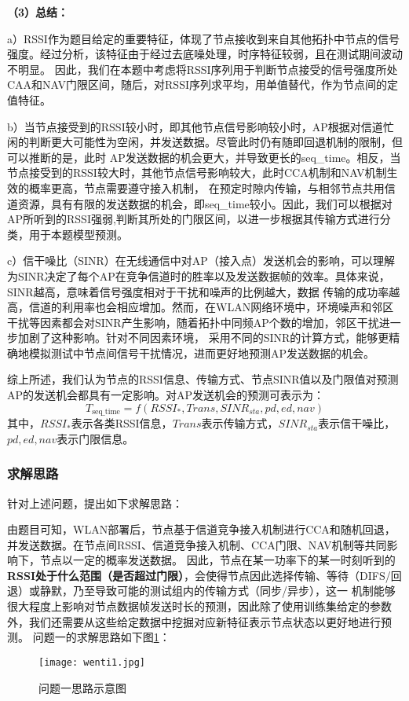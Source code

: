 \documentclass[bwprint]{gmcmthesis}
\begin{document}

\textbf{（3）总结：}

a）RSSI作为题目给定的重要特征，体现了节点接收到来自其他拓扑中节点的信号强度。经过分析，该特征由于经过去底噪处理，时序特征较弱，且在测试期间波动不明显。
因此，我们在本题中考虑将RSSI序列用于判断节点接受的信号强度所处CAA和NAV门限区间，随后，对RSSI序列求平均，用单值替代，作为节点间的定值特征。

b）当节点接受到的RSSI较小时，即其他节点信号影响较小时，AP根据对信道忙闲的判断更大可能性为空闲，并发送数据。尽管此时仍有随即回退机制的限制，但可以推断的是，此时
AP发送数据的机会更大，并导致更长的seq\_time。相反，当节点接受到的RSSI较大时，其他节点信号影响较大，此时CCA机制和NAV机制生效的概率更高，节点需要遵守接入机制，
在预定时隙内传输，与相邻节点共用信道资源，具有有限的发送数据的机会，即seq\_time较小。因此，我们可以根据对AP所听到的RSSI强弱,判断其所处的门限区间，以进一步根据其传输方式进行分类，用于本题模型预测。

c）信干噪比（SINR）在无线通信中对AP（接入点）发送机会的影响，可以理解为SINR决定了每个AP在竞争信道时的胜率以及发送数据帧的效率。具体来说，SINR越高，意味着信号强度相对于干扰和噪声的比例越大，数据
传输的成功率越高，信道的利用率也会相应增加。然而，在WLAN网络环境中，环境噪声和邻区干扰等因素都会对SINR产生影响，随着拓扑中同频AP个数的增加，邻区干扰进一步加剧了这种影响。针对不同因素环境，
采用不同的SINR的计算方式，能够更精确地模拟测试中节点间信号干扰情况，进而更好地预测AP发送数据的机会。

综上所述，我们认为节点的RSSI信息、传输方式、节点SINR值以及门限值对预测AP的发送机会都具有一定影响。对AP发送机会的预测可表示为：
$$T_{\text{seq\_time}}=f(RSSI_{*},Trans,SINR_{sta},pd,ed,nav)$$
其中，$RSSI_{*}$表示各类RSSI信息，$Trans$表示传输方式，$SINR_{sta}$表示信干噪比，$pd,ed,nav$表示门限信息。



\subsubsection{求解思路}
针对上述问题，提出如下求解思路：

由题目可知，WLAN部署后，节点基于信道竞争接入机制进行CCA和随机回退，并发送数据。在节点间RSSI、信道竞争接入机制、CCA门限、NAV机制等共同影响下，节点以一定的概率发送数据。
因此，节点在某一功率下的某一时刻听到的\textbf{RSSI处于什么范围（是否超过门限）}，会使得节点因此选择传输、等待（DIFS/回退）或静默，乃至导致可能的测试组内的传输方式（同步/异步），这一
机制能够很大程度上影响对节点数据帧发送时长的预测，因此除了使用训练集给定的参数外，我们还需要从这些给定数据中挖掘对应新特征表示节点状态以更好地进行预测。
问题一的求解思路如下图\ref{pho:wenti1}：
\begin{figure}[!htbp]
    \centering
    \texttt{[image: wenti1.jpg]}
    \caption{\centering 问题一思路示意图}
    \label{pho:wenti1}
\end{figure}
\end{document}
